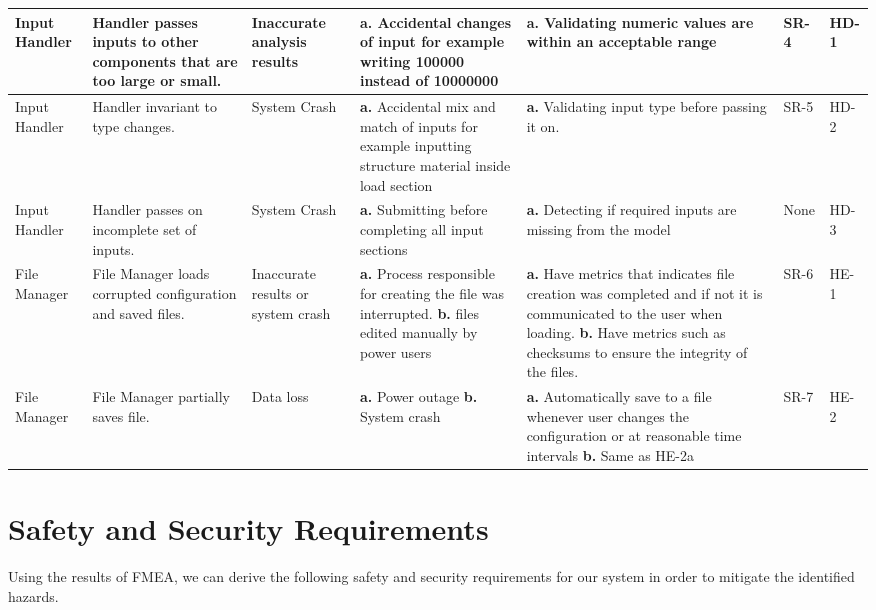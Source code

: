 \documentclass{article}
\begin{document}
\begin{landscape}
\begin{table}[H]
\begin{tabular}{|p{} | p{} | p{} | p{} | p{} | p{} | p{}|}
        Input Handler& Handler passes inputs to other components that are too large or small.
        & Inaccurate analysis results
        & \textbf{a.} Accidental changes of input for example writing 100000 instead of 10000000      
        & \textbf{a.} Validating numeric values are within an acceptable range   
        &SR-4&HD-1\\
        \midrule
        Input Handler& Handler invariant to type changes.
        & System Crash
        & \textbf{a.} Accidental mix and match of inputs for example inputting structure material inside load section
        & \textbf{a.} Validating input type before passing it on.    
        &SR-5&HD-2\\
        \midrule
        Input Handler& Handler passes on incomplete set of inputs.
        & System Crash
        & \textbf{a.} Submitting before completing all input sections     
        & \textbf{a.} Detecting if required inputs are missing from the model   
        &None&HD-3\\
        \midrule
        File Manager& File Manager loads corrupted configuration and saved files.
        & Inaccurate results or system crash
        & \textbf{a.} Process responsible for creating the file was interrupted.\newline
          \textbf{b.} files edited manually by power users
        & \textbf{a.} Have metrics that indicates file creation was completed and if not it is communicated to the user when loading.\newline
          \textbf{b.} Have metrics such as checksums to ensure the integrity of the files.  
        &SR-6&HE-1\\
        \midrule
        File Manager& File Manager partially saves file.
        & Data loss
        & \textbf{a.} Power outage\newline
          \textbf{b.} System crash        
        & \textbf{a.} Automatically save to a file whenever user changes the configuration or at reasonable time intervals\newline
        \textbf{b.} Same as HE-2a  
        &SR-7&HE-2\\
        \bottomrule
          \end{tabular}
          \end{table}

      
 
\end{landscape}

\newpage

\section{Safety and Security Requirements}
Using the results of FMEA, we can derive the following safety and security requirements for our system in order to mitigate the identified hazards. \\
\end{document}
